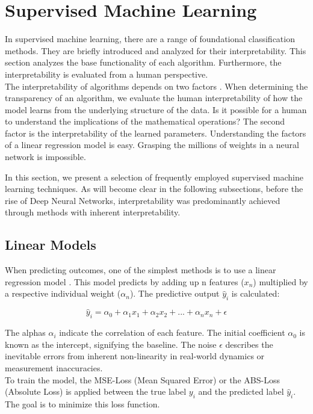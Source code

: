 \section{Supervised Machine Learning}

In supervised machine learning, there are a range of foundational classification methods. They are briefly introduced and analyzed for their interpretability. This section analyzes the base functionality of each algorithm. Furthermore, the interpretability is evaluated from a human perspective.
\\
The interpretability of algorithms depends on two factors \cite{molnar2022}. When determining the transparency of an algorithm, we evaluate the human interpretability of how the model learns from the underlying structure of the data. Is it possible for a human to understand the implications of the mathematical operations? The second factor is the interpretability of the learned parameters. Understanding the factors of a linear regression model is easy. Grasping the millions of weights in a neural network is impossible.

In this section, we present a selection of frequently employed supervised machine learning techniques. As will become clear in the following subsections, before the rise of Deep Neural Networks, interpretability was predominantly achieved through methods with inherent interpretability.

\subsection{Linear Models}

When predicting outcomes, one of the simplest methods is to use a linear regression model \cite{puntanen2013methods}. This model predicts by adding up n features ($x_n$) multiplied by a respective individual weight ($\alpha_n$). The predictive output $\hat{y}_i$ is calculated:

$$ \hat{y}_i= \alpha_0 + \alpha_1 x_1 + \alpha_2 x_2 +... +\alpha_n x_{n} + \epsilon$$

The alphas $\alpha_i$ indicate the correlation of each feature. The initial coefficient $\alpha_0$ is known as the intercept, signifying the baseline. The noise $\epsilon$ describes the inevitable errors from inherent non-linearity in real-world dynamics or measurement inaccuracies.
\\
To train the model, the MSE-Loss (Mean Squared Error) or the ABS-Loss (Absolute Loss) is applied between the true label $y_i$ and the predicted label $\hat{y}_i$. The goal is to minimize this loss function. 


